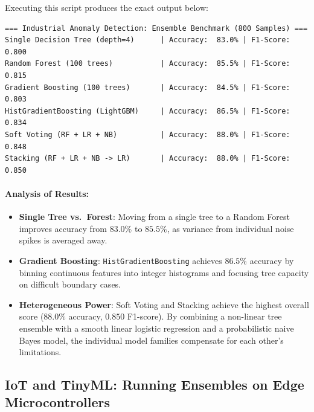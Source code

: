 Executing this script produces the exact output below:
\begin{lstlisting}[style=outputstyle]
=== Industrial Anomaly Detection: Ensemble Benchmark (800 Samples) ===
Single Decision Tree (depth=4)      | Accuracy:  83.0% | F1-Score: 0.800
Random Forest (100 trees)           | Accuracy:  85.5% | F1-Score: 0.815
Gradient Boosting (100 trees)       | Accuracy:  84.5% | F1-Score: 0.803
HistGradientBoosting (LightGBM)     | Accuracy:  86.5% | F1-Score: 0.834
Soft Voting (RF + LR + NB)          | Accuracy:  88.0% | F1-Score: 0.848
Stacking (RF + LR + NB -> LR)       | Accuracy:  88.0% | F1-Score: 0.850
\end{lstlisting}

\paragraph{Analysis of Results:}
\begin{itemize}
    \item \textbf{Single Tree vs.\ Forest}: Moving from a single tree to a Random Forest improves accuracy from $83.0\%$ to $85.5\%$, as variance from individual noise spikes is averaged away.
    \item \textbf{Gradient Boosting}: \texttt{HistGradientBoosting} achieves $86.5\%$ accuracy by binning continuous features into integer histograms and focusing tree capacity on difficult boundary cases.
    \item \textbf{Heterogeneous Power}: Soft Voting and Stacking achieve the highest overall score ($88.0\%$ accuracy, $0.850$ F1-score). By combining a non-linear tree ensemble with a smooth linear logistic regression and a probabilistic naive Bayes model, the individual model families compensate for each other's limitations.
\end{itemize}

\subsection{IoT and TinyML: Running Ensembles on Edge Microcontrollers}\label{subsec:ensembles_iot}

